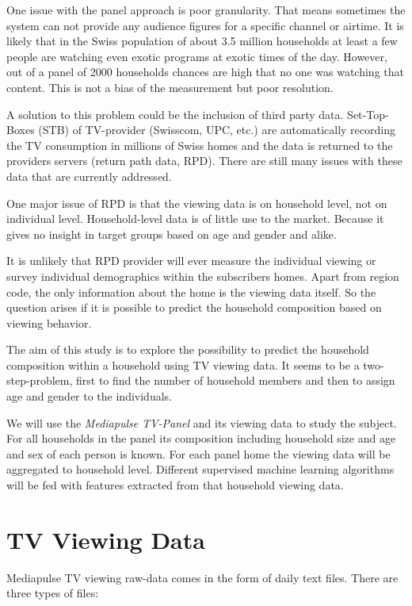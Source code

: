 \documentclass[]{article}
\begin{document}
One issue with the panel approach is poor granularity. That means
sometimes the system can not provide any audience figures for a specific
channel or airtime. It is likely that in the Swiss population of about
3.5 million households at least a few people are watching even exotic
programs at exotic times of the day. However, out of a panel of 2000
households chances are high that no one was watching that content. This
is not a bias of the measurement but poor resolution.

A solution to this problem could be the inclusion of third party data.
Set-Top-Boxes (STB) of TV-provider (Swisscom, UPC, etc.) are
automatically recording the TV consumption in millions of Swiss homes
and the data is returned to the providers servers (return path data,
RPD). There are still many issues with these data that are currently
addressed.

One major issue of RPD is that the viewing data is on household level,
not on individual level. Household-level data is of little use to the
market. Because it gives no insight in target groups based on age and
gender and alike.

It is unlikely that RPD provider will ever measure the individual
viewing or survey individual demographics within the subscribers homes.
Apart from region code, the only information about the home is the
viewing data itself. So the question arises if it is possible to predict
the household composition based on viewing behavior.

The aim of this study is to explore the possibility to predict the
household composition within a household using TV viewing data. It seems
to be a two-step-problem, first to find the number of household members
and then to assign age and gender to the individuals.

We will use the \emph{Mediapulse TV-Panel} and its viewing data to study
the subject. For all households in the panel its composition including
household size and age and sex of each person is known. For each panel
home the viewing data will be aggregated to household level. Different
supervised machine learning algorithms will be fed with features
extracted from that household viewing data.

\hypertarget{tv-viewing-data}{%
\section{TV Viewing Data}\label{tv-viewing-data}}

Mediapulse TV viewing raw-data comes in the form of daily text files.
There are three types of files:
\end{document}
